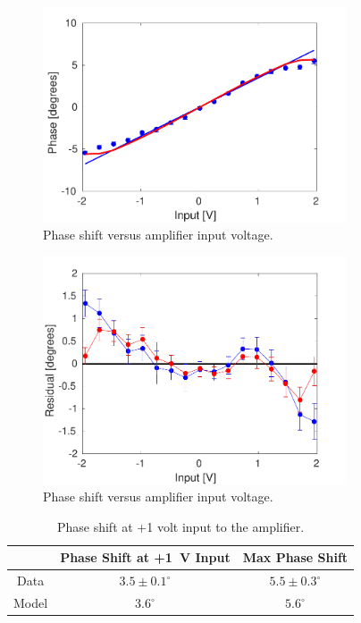 \begin{figure}
  \centering
  \includegraphics[width=0.8\textwidth]{Figures/commissioning/phaseVsAmpVoltage}
  \caption{Phase shift versus amplifier input voltage.}
  \label{f:phaseVsAmpVoltage}
\end{figure}

\begin{figure}
  \centering
  \includegraphics[width=0.8\textwidth]{Figures/commissioning/phaseVsAmpVoltage_residuals}
  \caption{Phase shift versus amplifier input voltage.}
  \label{f:phaseVsAmp_resid}
\end{figure}

\begin{table}
  \begin{center}
    \begin{tabular}{| c | c | c |}
	   \hline
        & Phase Shift at +1~V Input & Max Phase Shift \\ \hline
       Data & \(3.5\pm0.1^\circ\) & \(5.5\pm0.3^\circ\) \\
	   Model & \(3.6^\circ\) & \(5.6^\circ\) \\
 	   \hline
    \end{tabular}
    \caption{Phase shift at +1 volt input to the amplifier.}
  	\label{t:PhaseVsDAC}
  \end{center}
\end{table}

